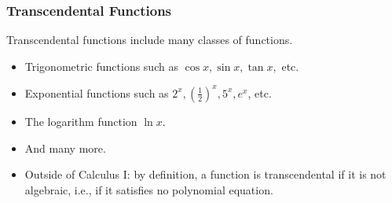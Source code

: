 \begin{frame}
\frametitle{Transcendental Functions}
Transcendental functions include many classes of functions.
\begin{itemize}
\item<2->  Trigonometric functions such as $\cos x, \sin x, \tan x,$ etc.
\item<3->  Exponential functions such as $2^x, \left( \frac{1}{2}\right)^x, 5^x, e^x$, etc.
\item<4->  The logarithm function $\ln x$.
\item<5->  And many more.
\item<6-> Outside of Calculus I: by definition, a function is transcendental if it is not algebraic, i.e., if it satisfies no polynomial equation.
\end{itemize}
\end{frame}
